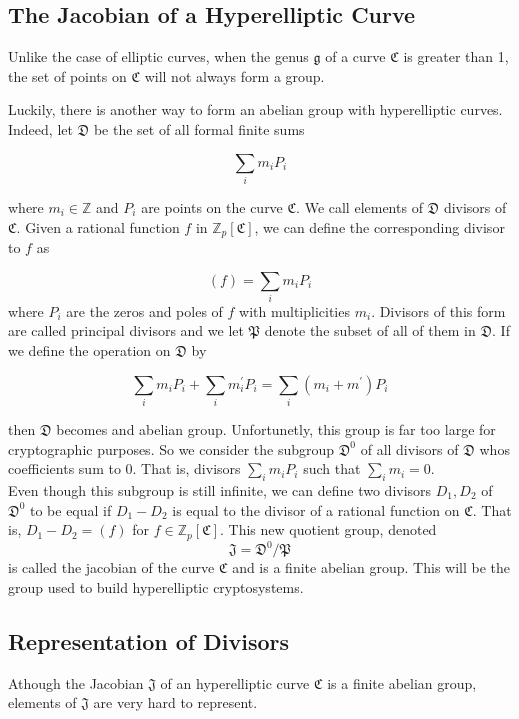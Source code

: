 \subsection{The Jacobian of a Hyperelliptic Curve}

Unlike the case of elliptic curves, when the genus $\mathfrak{g}$ of a curve $\mathfrak{C} $ is greater than 1, the set of points on $\mathfrak{C}$ will not always form a group. 

\begin{example}

\end{example}

Luckily, there is another way to form an abelian group with hyperelliptic curves. Indeed, let $\mathfrak{D}$ be the set of all formal finite sums 

$$ \sum_i m_i P_i $$ 

where $m_i \in \mathbb{Z}$ and $P_i$ are points on the curve $\mathfrak{C}$. We call elements of $\mathfrak{D}$ divisors of $\mathfrak{C}$. Given a rational function $f$ in $\mathbb{Z}_p[\mathfrak{C}]$, we can define the corresponding divisor to $f$ as

$$(f) = \sum_i m_i P_i $$ where $P_i$ are the zeros and poles of $f$ with multiplicities $m_i$. Divisors of this form are called principal divisors and we let $\mathfrak{P}$ denote the subset of all of them in $\mathfrak{D}$. If we define the operation on $\mathfrak{D}$ by 

$$ \sum_i m_i P_i  + \sum_i m^\prime_i P_i  = \sum_i (m_i+m^\prime) P_i $$ 

then $\mathfrak{D}$ becomes and abelian group. Unfortunetly, this group is far too large for cryptographic purposes. So we consider the subgroup $\mathfrak{D}^0$ of all divisors of $\mathfrak{D}$ whos coefficients sum to $0$. That is, divisors $ \sum_i m_i P_i $ such that $\sum_i m_i = 0$. \\ 

Even though this subgroup is still infinite, we can define two divisors $D_1, D_2$ of $\mathfrak{D}^0$ to be equal if $D_1 - D_2$ is equal to the divisor of a rational function on $\mathfrak{C}$. That is, $D_1 - D_2 = (f) $ for $f \in \mathbb{Z}_p[\mathfrak{C}]$. This new quotient group, denoted $$ \mathfrak{J} = \mathfrak{D}^0 / \mathfrak{P}$$ is called the jacobian of the curve $\mathfrak{C}$ and is a finite abelian group. This will be the group used to build hyperelliptic cryptosystems.

\subsection{Representation of Divisors}

Athough the Jacobian $\mathfrak{J}$ of an hyperelliptic curve $\mathfrak{C}$ is a finite abelian group, elements of $\mathfrak{J}$ are very hard to represent. 

\begin{example}
\end{example} 

